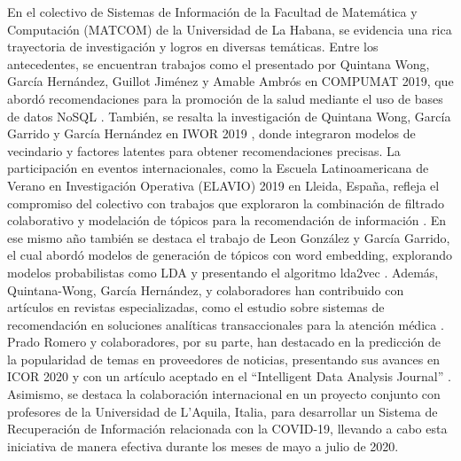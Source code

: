 En el colectivo de Sistemas de Información de la Facultad de Matemática y Computación (MATCOM) de la Universidad de La Habana, se evidencia una rica trayectoria de investigación y logros en diversas temáticas. Entre los antecedentes, se encuentran trabajos como el presentado por Quintana Wong, García Hernández, Guillot Jiménez y Amable Ambrós en COMPUMAT 2019, que abordó recomendaciones para la promoción de la salud mediante el uso de bases de datos NoSQL \cite{quintana-wong_recommendations_2019}. También, se resalta la investigación de Quintana Wong, Garc\'ia Garrido y García Hernández en IWOR 2019 \cite{quintana-wong_integrating_2019}, donde integraron modelos de vecindario y factores latentes para obtener recomendaciones precisas. La participación en eventos internacionales, como la Escuela Latinoamericana de Verano en Investigación Operativa (ELAVIO) 2019 en Lleida, España, refleja el compromiso del colectivo con trabajos que exploraron la combinación de filtrado colaborativo y modelación de tópicos para la recomendación de información \cite{quintana-wong_latent_2019}. En ese mismo a\~no también se destaca el trabajo de Leon González y Garc\'ia Garrido, el cual abordó modelos de generación de tópicos con word embedding, explorando modelos probabilistas como LDA y presentando el algoritmo lda2vec \cite{gonzalez_modelos_nodate}. Además, Quintana-Wong, García Hernández, y colaboradores han contribuido con artículos en revistas especializadas, como el estudio sobre sistemas de recomendación en soluciones analíticas transaccionales para la atención médica \cite{quintana-wong_recommendations_2019}. Prado Romero y colaboradores, por su parte, han destacado en la predicción de la popularidad de temas en proveedores de noticias, presentando sus avances en ICOR 2020 y con un artículo aceptado en el ``Intelligent Data Analysis Journal'' \cite{prado-romero_time-sensitive_2020}. Asimismo, se destaca la colaboración internacional en un proyecto conjunto con profesores de la Universidad de L'Aquila, Italia, para desarrollar un Sistema de Recuperación de Información relacionada con la COVID-19, llevando a cabo esta iniciativa de manera efectiva durante los meses de mayo a julio de 2020. %

